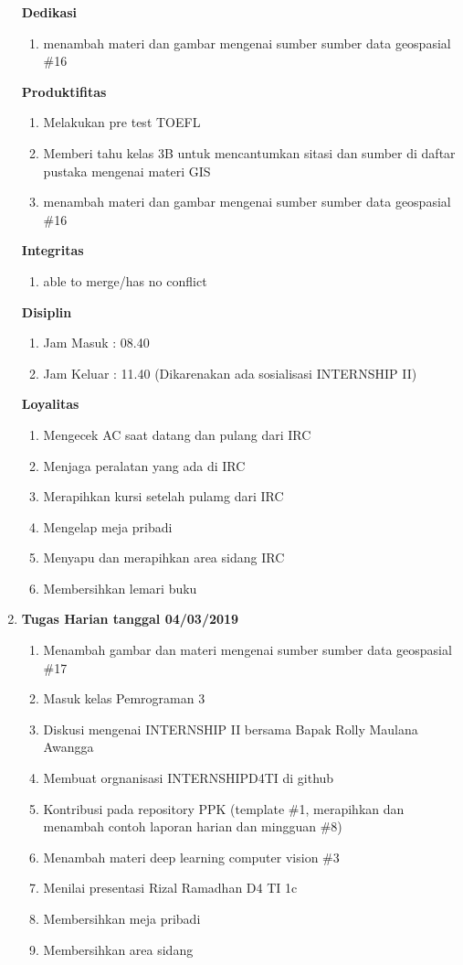 \begin{enumerate}
\textbf{Dedikasi}
\begin{enumerate}
\item menambah materi dan gambar mengenai sumber sumber data geospasial \#16
\end{enumerate}

\textbf{Produktifitas}
\begin{enumerate}
\item Melakukan pre test TOEFL 
\item Memberi tahu kelas 3B untuk mencantumkan sitasi dan sumber di daftar pustaka mengenai materi GIS
\item menambah materi dan gambar mengenai sumber sumber data geospasial \#16
\end{enumerate}

\textbf{Integritas}
\begin{enumerate}
\item able to merge/has no conflict
\end{enumerate}


\textbf{Disiplin}
\begin{enumerate}
\item Jam Masuk : 08.40
\item Jam Keluar : 11.40 (Dikarenakan ada sosialisasi INTERNSHIP II)
\end{enumerate}


\textbf{Loyalitas}
\begin{enumerate}
\item Mengecek AC saat datang dan pulang dari IRC
\item Menjaga peralatan yang ada di IRC
\item Merapihkan kursi setelah pulamg dari IRC
\item Mengelap meja pribadi
\item Menyapu dan merapihkan area sidang IRC
\item Membersihkan lemari buku 
\end{enumerate}

\item \textbf{Tugas Harian tanggal 04/03/2019}
\begin{enumerate}
\item Menambah gambar dan materi mengenai sumber sumber data geospasial \#17
\item Masuk kelas Pemrograman 3 
\item Diskusi mengenai INTERNSHIP II bersama Bapak Rolly Maulana Awangga
\item Membuat orgnanisasi INTERNSHIPD4TI di github
\item Kontribusi pada repository PPK (template \#1, merapihkan dan menambah contoh laporan harian dan mingguan \#8)
\item Menambah materi deep learning computer vision \#3
\item Menilai presentasi Rizal Ramadhan D4 TI 1c 
\item Membersihkan meja pribadi
\item Membersihkan area sidang 
\end{enumerate}


\end{enumerate}

